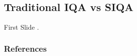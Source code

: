 \documentclass[aspectratio=169]{beamer}
\begin{document}
\subsection{Traditional IQA vs SIQA}



\begin{frame}
    First Slide
    \cite{wikibook}.

\end{frame}

\begin{frame}[allowframebreaks]
    \frametitle{References}
    \printbibliography
\end{frame}
\end{document}
